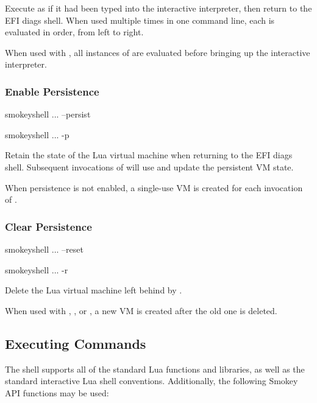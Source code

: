 Execute  as if it had been typed into the interactive
interpreter, then return to the EFI diags shell.  When used multiple times in
one command line, each  is evaluated in order, from left to
right.

When used with , all instances of 
are evaluated before bringing up the interactive interpreter.

\subsubsection{Enable Persistence}

\begin{CommandLine}
smokeyshell ... --persist
\end{CommandLine}

\begin{CommandLine}
smokeyshell ... -p
\end{CommandLine}

Retain the state of the Lua virtual machine when returning to the EFI diags
shell.  Subsequent invocations of  will use and update the
persistent VM state.

When persistence is not enabled, a single-use VM is created for each invocation
of .

\subsubsection{Clear Persistence}

\begin{CommandLine}
smokeyshell ... --reset
\end{CommandLine}

\begin{CommandLine}
smokeyshell ... -r
\end{CommandLine}

Delete the Lua virtual machine left behind by .

When used with , , or
, a new VM is created after the old one is deleted.

\subsection{Executing Commands}

The shell supports all of the standard Lua functions and libraries, as well as
the standard interactive Lua shell conventions.  Additionally, the following
Smokey API functions may be used:

